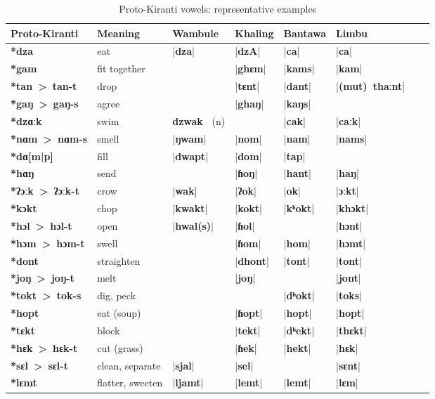 \documentclass[oldfontcommands,oneside,a4paper,11pt]{article}
\newcommand{\ipa}[1]{\textbf{{\phon\mbox{#1}}}} %
\newcommand{\dhat}[1]{|\ipa{#1}|}
\begin{document}
 \begin{table}[H]
 \caption{Proto-Kiranti vowels: representative examples} \centering \label{tab:vowels.ex}
 \begin{tabular}{llllllll}
 \toprule
Proto-Kiranti & Meaning &Wambule & Khaling & Bantawa & Limbu \\
 \midrule
\ipa{*dza} &	eat &	\dhat{dza} &	\dhat{dzA} &	\dhat{ca} &	\dhat{ca} &	\\
\ipa{*gam} &	fit together &	&	\dhat{ghɛm} &	\dhat{kams} &	\dhat{kam} &	\\
\ipa{*tan > tan-t} &	drop &	&	\dhat{tɛnt} &	\dhat{dant} &	\dhat{(mut) thaːnt} &	\\
\ipa{*gaŋ > gaŋ-s} &	agree &	&	\dhat{ghaŋ} &	\dhat{kaŋs} &	&	\\
 \midrule						
\ipa{*dzɑːk} &	swim &	\ipa{dzwak } (n) &	&	\dhat{cak} &	\dhat{caːk} &	\\
\ipa{*nɑm > nɑm-s} &	smell &	\dhat{ŋwam} &	\dhat{nom} &	\dhat{nam} &	\dhat{nams} &	\\
\ipa{*dɑ[m|p]} &	fill &	\dhat{dwapt} &	\dhat{dom} &	\dhat{tap} &	&	\\
\ipa{*hɑŋ} &	send &	&	\dhat{ɦoŋ} &	\dhat{hant} &	\dhat{haŋ} &	\\
\midrule
\ipa{*ʔɔːk > ʔɔːk-t} &	crow &	\dhat{wak} &	\dhat{ʔok} &	\dhat{ok} &	\dhat{ɔːkt} &	\\
\ipa{*kɔkt} &	chop &	\dhat{kwakt} &	\dhat{kokt} &	\dhat{kʰokt} &	\dhat{khɔkt} &	\\
\ipa{*hɔl > hɔl-t} &	open &	\dhat{hwal(s)} &	\dhat{ɦol} &	&	\dhat{hɔnt} &	\\
\ipa{*hɔm > hɔm-t} &	swell &	&	\dhat{ɦom} &	\dhat{hom} &	\dhat{hɔmt} &	\\
\midrule
\ipa{*dont} &	straighten &	&	\dhat{dhont} &	\dhat{tont} &	\dhat{tont} &	\\
\ipa{*joŋ > joŋ-t} &	melt &	&	\dhat{joŋ} &	&	\dhat{jont} &	\\
\ipa{*tokt > tok-s} &	dig, peck &	&	&	\dhat{dʰokt} &	\dhat{toks} &	\\
\ipa{*hopt} &	eat (soup) &	&	\dhat{ɦopt} &	\dhat{hopt} &	\dhat{hopt} &	\\
\midrule
\ipa{*tɛkt} &	block &	&	\dhat{tekt} &	\dhat{dʰekt} &	\dhat{thɛkt} &	\\
\ipa{*hɛk > hɛk-t} &	cut (grass) &	&	\dhat{ɦek} &	\dhat{hekt} &	\dhat{hɛk} &	\\
\ipa{*sɛl > sɛl-t} &	clean, separate &	\dhat{sjal} &	\dhat{sel} &	&	\dhat{sɛnt} &	\\
\ipa{*lɛmt} &	flatter, sweeten &	\dhat{ljamt} &	\dhat{lemt} &	\dhat{lemt} &	\dhat{lɛm} &	\\

\end{tabular}
\end{table}
\end{document}
